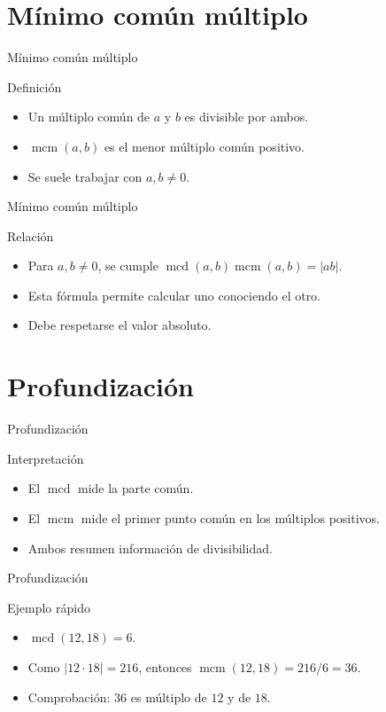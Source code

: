 \documentclass[aspectratio=169,11pt]{beamer}
\newcommand{\mcd}{\operatorname{mcd}}
\newcommand{\mcm}{\operatorname{mcm}}
\begin{document}
\section{Mínimo común múltiplo}

\begin{frame}{Mínimo común múltiplo}
\begin{block}{Definición}
\begin{itemize}
  \item Un múltiplo común de \(a\) y \(b\) es divisible por ambos.
  \item \(\mcm(a,b)\) es el menor múltiplo común positivo.
  \item Se suele trabajar con \(a,b\neq 0\).
\end{itemize}
\end{block}
\end{frame}

\begin{frame}{Mínimo común múltiplo}
\begin{block}{Relación}
\begin{itemize}
  \item Para \(a,b\neq 0\), se cumple \(\mcd(a,b)\mcm(a,b)=|ab|\).
  \item Esta fórmula permite calcular uno conociendo el otro.
  \item Debe respetarse el valor absoluto.
\end{itemize}
\end{block}
\end{frame}

\section{Profundización}

\begin{frame}{Profundización}
\begin{block}{Interpretación}
\begin{itemize}
  \item El \(\mcd\) mide la parte común.
  \item El \(\mcm\) mide el primer punto común en los múltiplos positivos.
  \item Ambos resumen información de divisibilidad.
\end{itemize}
\end{block}
\end{frame}

\begin{frame}{Profundización}
\begin{block}{Ejemplo rápido}
\begin{itemize}
  \item \(\mcd(12,18)=6\).
  \item Como \(|12\cdot 18|=216\), entonces \(\mcm(12,18)=216/6=36\).
  \item Comprobación: \(36\) es múltiplo de \(12\) y de \(18\).
\end{itemize}
\end{block}
\end{frame}
\end{document}
